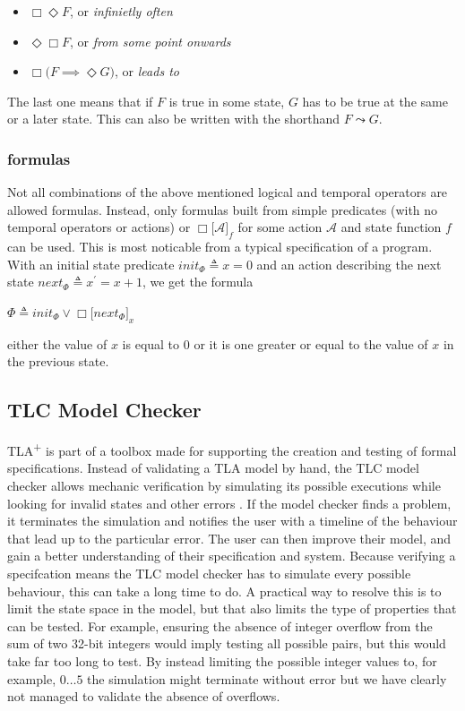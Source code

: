 \documentclass[english, biblatex, digitaloutput]{kththesis}
\begin{document}
\begin{itemize}
	\item $\Box\Diamond F$, or \textit{infinietly often}
	\item $\Diamond\Box F$, or \textit{from some point onwards}
	\item $\Box \lparen F \implies \Diamond G \rparen$, or \textit{leads to}
\end{itemize}

The last one means that if $F$ is true in some state, $G$ has to be true at the same or a later state. This can also be written with the shorthand $F \leadsto G$.

\subsubsection{ formulas}

Not all combinations of the above mentioned logical and temporal operators are allowed  formulas. Instead, only formulas built from simple predicates (with no temporal operators or actions) or $\Box \lbrack \mathcal{A}  \rbrack_{f}$ for some action $\mathcal{A}$ and state function $f$ can be used. This is most noticable from a typical  specification of a program. With an initial state predicate $init_\Phi \triangleq x = 0$ and an action describing the next state $next_\Phi \triangleq x^\prime = x + 1$, we get the  formula

\begin{math}
	\Phi \triangleq init_\Phi \lor \Box \lbrack next_\Phi \rbrack_x
\end{math}

\ie either the value of $x$ is equal to 0 or it is one greater or equal to the value of $x$ in the previous state.

\subsection{TLC Model Checker}

TLA\textsuperscript+ is part of a toolbox made for supporting the creation and testing of formal specifications. Instead of validating a TLA model by hand, the TLC model checker allows mechanic verification by simulating its possible executions while looking for invalid states and other errors \cite{goos_model_1999}. If the model checker finds a problem, it terminates the simulation and notifies the user with a timeline of the behaviour that lead up to the particular error. The user can then improve their model, and gain a better understanding of their specification and system. Because verifying a specifcation means the TLC model checker has to simulate every possible behaviour, this can take a long time to do. A practical way to resolve this is to limit the state space in the model, but that also limits the type of properties that can be tested. For example, ensuring the absence of integer overflow from the sum of two 32-bit integers would imply testing all possible pairs, but this would take far too long to test. By instead limiting the possible integer values to, for example, $0 \dotsc 5$ the simulation might terminate without error but we have clearly not managed to validate the absence of overflows.
\end{document}
